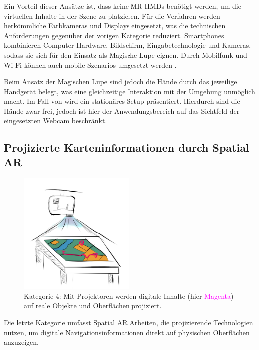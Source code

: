 Ein Vorteil dieser Ansätze ist, dass keine MR-HMDs benötigt werden, um die virtuellen Inhalte in der Szene zu platzieren.
Für die Verfahren werden herkömmliche Farbkameras und Displays eingesetzt, was die technischen Anforderungen gegenüber der vorigen Kategorie reduziert.
Smartphones kombinieren Computer-Hardware, Bildschirm, Eingabetechnologie und Kameras, sodass sie sich für den Einsatz als Magische Lupe eignen.
Durch Mobilfunk und Wi-Fi können auch mobile Szenarios umgesetzt werden \parencite[5]{Bimber2006}.

Beim Ansatz der Magischen Lupe sind jedoch die Hände durch das jeweilige Handgerät belegt, was eine gleichzeitige Interaktion mit der Umgebung unmöglich macht.
Im Fall von \textcite{Moore2005} wird ein stationäres Setup präsentiert.
Hierdurch sind die Hände zwar frei, jedoch ist hier der Anwendungsbereich auf das Sichtfeld der eingesetzten Webcam beschränkt.

\subsection{Projizierte Karteninformationen durch Spatial AR}
\begin{figure}[h]
    \centering
    \includegraphics[width=0.5\textwidth]{figures/sketch_ar_projected}
    \caption{Kategorie 4: Mit Projektoren werden digitale Inhalte (hier \textcolor{magenta}{Magenta}) auf reale Objekte und Oberflächen projiziert.}
    \label{fig:sketch_ar_projected}
\end{figure}

Die letzte Kategorie umfasst Spatial AR Arbeiten, die projizierende Technologien nutzen, um digitale Navigationsinformationen direkt auf physischen Oberflächen anzuzeigen.

